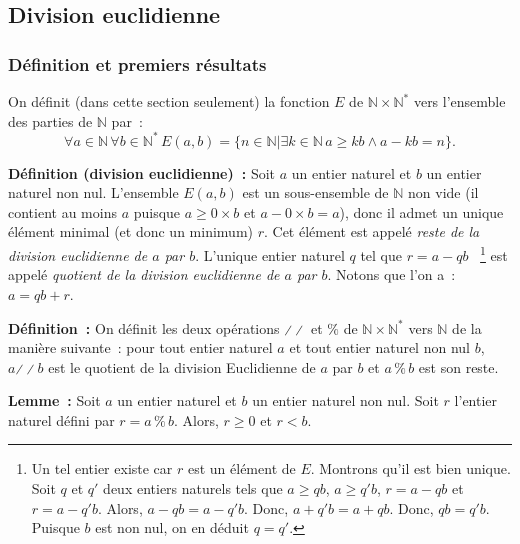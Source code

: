 \subsection{Division euclidienne}

\subsubsection{Définition et premiers résultats}

On définit (dans cette section seulement) la fonction $E$ de $\mathbb{N} \times \mathbb{N}^*$ vers l'ensemble des parties de $\mathbb{N}$ par : 
\begin{equation*}
    \forall a \in \mathbb{N} \, 
    \forall b \in \mathbb{N}^* \, 
    E(a,b) = \lbrace
        n \in \mathbb{N} 
        \vert
        \exists k \in \mathbb{N} \,  
        a \geq k b \wedge a - k b = n
    \rbrace .
\end{equation*}

\medskip

\noindent\textbf{Définition (division euclidienne) :}
Soit $a$ un entier naturel et $b$ un entier naturel non nul.
L'ensemble $E(a,b)$ est un sous-ensemble de $\mathbb{N}$ non vide (il contient au moins $a$ puisque $a \geq 0 \times b$ et $a - 0 \times b = a$), donc il admet un unique élément minimal (et donc un minimum) $r$. 
Cet élément est appelé \textit{reste de la division euclidienne de $a$ par $b$}. 
L'unique entier naturel $q$ tel que $r = a - q b$%
~\footnote{Un tel entier existe car $r$ est un élément de $E$. 
    Montrons qu'il est bien unique. 
    Soit $q$ et $q'$ deux entiers naturels tels que $a \geq q b$, $a \geq q' b$, $r = a - q b$ et $r = a - q' b$.
    Alors, $a - q b = a - q' b$.
    Donc, $a + q' b = a + q b$.
    Donc, $q b = q' b$.
    Puisque $b$ est non nul, on en déduit $q = q'$.
}  
est appelé \textit{quotient de la division euclidienne de $a$ par $b$}. 
Notons que l'on a : $a = q b + r$. 

\medskip

\noindent\textbf{Définition :} On définit les deux opérations $\divslash\!\divslash$ et $\%$ de $\mathbb{N} \times \mathbb{N}^*$ vers $\mathbb{N}$ de la manière suivante : pour tout entier naturel $a$ et tout entier naturel non nul $b$, $a \mathrel{\divslash\!\divslash} b$ est le quotient de la division Euclidienne de $a$ par $b$ et $a \mathrel{\%} b$ est son reste. 

\medskip

\noindent\textbf{Lemme :} Soit $a$ un entier naturel et $b$ un entier naturel non nul.
    Soit $r$ l'entier naturel défini par $r = a \mathrel{\%} b$.
    Alors, $r \geq 0$ et $r < b$.

